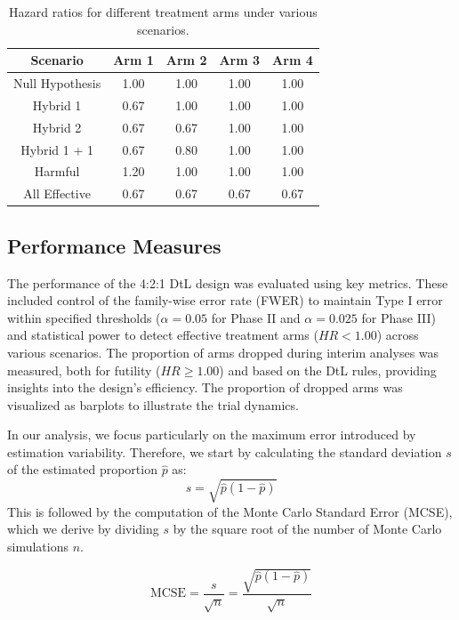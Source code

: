 \documentclass[11pt, a4paper]{article}\usepackage[]{graphicx}\usepackage[]{xcolor}
\begin{document}
\begin{table}[H]
    \centering
    \caption{Hazard ratios for different treatment arms under various scenarios.}
    \label{tab:hazard_ratios}
    \begin{tabular}{|c|c|c|c|c|}
        \hline
        \rowcolor{gray!20}
        \textbf{Scenario} & \textbf{Arm 1} & \textbf{Arm 2} & \textbf{Arm 3} & \textbf{Arm 4} \\ \hline
        Null Hypothesis & 1.00 & 1.00 & 1.00 & 1.00 \\ \hline
        Hybrid 1        & 0.67 & 1.00 & 1.00 & 1.00 \\ \hline
        Hybrid 2        & 0.67 & 0.67 & 1.00 & 1.00 \\ \hline
        Hybrid 1 + 1    & 0.67 & 0.80 & 1.00 & 1.00 \\ \hline
        Harmful         & 1.20 & 1.00 & 1.00 & 1.00 \\ \hline
        All Effective   & 0.67 & 0.67 & 0.67 & 0.67 \\ \hline
    \end{tabular}
\end{table}


\subsection*{Performance Measures}
The performance of the 4:2:1 DtL design was evaluated using key metrics. These included control of the family-wise error rate (FWER) to maintain Type I error within specified thresholds (\(\alpha = 0.05\) for Phase II and \(\alpha = 0.025\) for Phase III) and statistical power to detect effective treatment arms (\(HR < 1.00\)) across various scenarios. The proportion of arms dropped during interim analyses was measured, both for futility (\(HR \geq 1.00\)) and based on the DtL rules, providing insights into the design's efficiency. The proportion of dropped arms was visualized as barplots to illustrate the trial dynamics.

In our analysis, we focus particularly on the maximum error introduced by estimation variability. Therefore, we start by calculating the standard deviation \( s \) of the estimated proportion \(\hat{p}\) as:
\[
s = \sqrt{\hat{p}(1 - \hat{p})}
\]
This is followed by the computation of the Monte Carlo Standard Error (MCSE), which we derive by dividing \( s \) by the square root of the number of Monte Carlo simulations \( n \).

\begin{equation}
\text{MCSE} = \frac{s}{\sqrt{n}} = \frac{\sqrt{\hat{p}(1 - \hat{p})}}{\sqrt{n}}
\end{equation}
\end{document}
